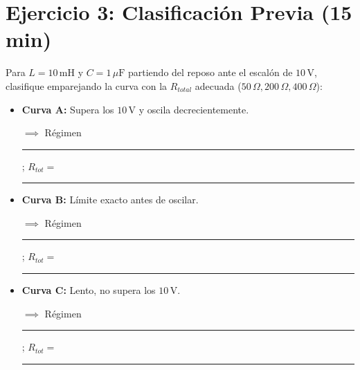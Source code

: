 \documentclass[11pt, a4paper]{article}
\begin{document}
\section*{Ejercicio 3: Clasificación Previa (15 min)}
Para $L=10\,\text{mH}$ y $C=1\,\mu\text{F}$ partiendo del reposo ante el escalón de $10\,\text{V}$, clasifique emparejando la curva con la $R_{total}$ adecuada ($50\,\Omega, 200\,\Omega, 400\,\Omega$):
\begin{itemize}\setlength\itemsep{0.5cm}
    \item \textbf{Curva A:} Supera los $10\,\text{V}$ y oscila decrecientemente. \par
    \vspace{0.1cm}
    $\implies$ Régimen \rule{4cm}{0.4pt} ; \quad $R_{tot} =$ \rule{2cm}{0.4pt}
    
    \item \textbf{Curva B:} Límite exacto antes de oscilar. \par
    \vspace{0.1cm}
    $\implies$ Régimen \rule{4cm}{0.4pt} ; \quad $R_{tot} =$ \rule{2cm}{0.4pt}
    
    \item \textbf{Curva C:} Lento, no supera los $10\,\text{V}$. \par
    \vspace{0.1cm}
    $\implies$ Régimen \rule{4cm}{0.4pt} ; \quad $R_{tot} =$ \rule{2cm}{0.4pt}
\end{itemize}
\end{document}
